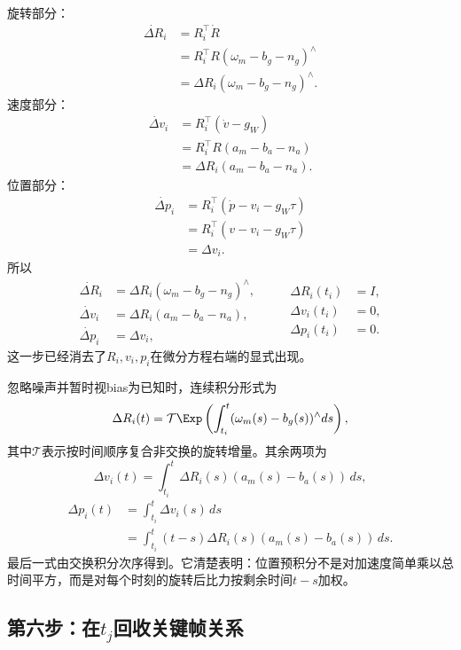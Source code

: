 旋转部分：
\[
\begin{aligned}
    \dot{\Delta R}_i
    &=R_i^\top\dot R\\
    &=R_i^\top R(\omega_m-b_g-n_g)^\wedge\\
    &=\Delta R_i(\omega_m-b_g-n_g)^\wedge.
\end{aligned}
\]
速度部分：
\[
\begin{aligned}
    \dot{\Delta v}_i
    &=R_i^\top(\dot v-g_W)\\
    &=R_i^\top R(a_m-b_a-n_a)\\
    &=\Delta R_i(a_m-b_a-n_a).
\end{aligned}
\]
位置部分：
\[
\begin{aligned}
    \dot{\Delta p}_i
    &=R_i^\top(\dot p-v_i-g_W\tau)\\
    &=R_i^\top(v-v_i-g_W\tau)\\
    &=\Delta v_i.
\end{aligned}
\]
所以
\[
\boxed{
\begin{aligned}
    \dot{\Delta R}_i
    &=\Delta R_i(\omega_m-b_g-n_g)^\wedge,\\
    \dot{\Delta v}_i
    &=\Delta R_i(a_m-b_a-n_a),\\
    \dot{\Delta p}_i
    &=\Delta v_i,
\end{aligned}
\qquad
\begin{aligned}
    \Delta R_i(t_i)&=I,\\
    \Delta v_i(t_i)&=0,\\
    \Delta p_i(t_i)&=0.
\end{aligned}
}
\]
这一步已经消去了$R_i,v_i,p_i$在微分方程右端的显式出现。

忽略噪声并暂时视bias为已知时，连续积分形式为
\[
    \Delta R_i(t)
    =\mathcal T\Exp\left(
       \int_{t_i}^{t}(\omega_m(s)-b_g(s))^\wedge ds
      \right),
\]
其中$\mathcal T$表示按时间顺序复合非交换的旋转增量。其余两项为
\[
\boxed{
    \Delta v_i(t)
    =\int_{t_i}^{t}
      \Delta R_i(s)(a_m(s)-b_a(s))\,ds,
}
\]
\[
\boxed{
\begin{aligned}
    \Delta p_i(t)
    &=\int_{t_i}^{t}\Delta v_i(s)\,ds\\
    &=\int_{t_i}^{t}
      (t-s)\Delta R_i(s)(a_m(s)-b_a(s))\,ds.
\end{aligned}
}
\]
最后一式由交换积分次序得到。它清楚表明：位置预积分不是对加速度简单乘以总时间平方，而是对每个时刻的旋转后比力按剩余时间$t-s$加权。

\subsection*{第六步：在$t_j$回收关键帧关系}

